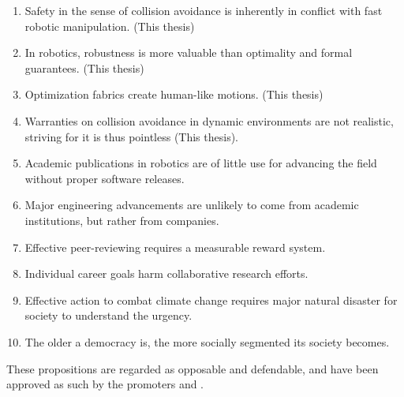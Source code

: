 \documentclass[nativefonts]{src/TUD-dissertation2020}
\begin{document}
\begin{enumerate}

  \item Safety in the sense of collision avoidance is inherently in conflict
    with fast robotic manipulation. (This thesis)
  \item In robotics, robustness is more valuable than optimality and formal
    guarantees. (This thesis)
  \item Optimization fabrics create human-like motions. (This thesis)
  \item Warranties on collision avoidance in dynamic environments are not
    realistic, striving for it is thus pointless (This thesis).
  \item Academic publications in robotics are of little use for advancing the
    field without proper software releases.
  \item Major engineering advancements are unlikely to come from academic
    institutions, but rather from companies.
  \item Effective peer-reviewing requires a measurable
    reward system.
  \item Individual career goals harm collaborative research efforts.
  \item Effective action to combat climate change requires major natural disaster
    for society to understand the urgency.
  \item The older a democracy is, the more socially
    segmented its society becomes.
\end{enumerate}

\bigskip
\bigskip

\begin{center}
These propositions are regarded as opposable and defendable, and have been
  approved as such by the promoters \promotor{} and \copromotor{}.
\end{center}

\clearpage
\end{document}
